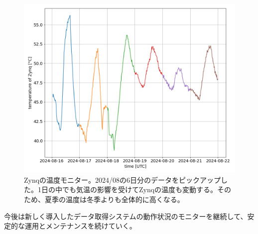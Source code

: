 
\begin{figure}[htbp]
  \centering
  \includegraphics[width=0.9\columnwidth]{4_elDAQ/figs/temp_zynq_202408.png}
  \caption{Zynqの温度モニター。2024/08の6日分のデータをピックアップした。1日の中でも気温の影響を受けてZynqの温度も変動する。そのため、夏季の温度は冬季よりも全体的に高くなる。}
  \label{temp_zynq}
\end{figure}

今後は新しく導入したデータ取得システムの動作状況のモニターを継続して、安定的な運用とメンテナンスを続けていく。
